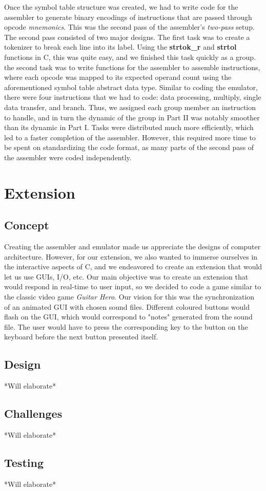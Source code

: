 \documentclass[11pt]{article}
\begin{document}
Once the symbol table structure was created, we had to write code for the assembler to generate binary encodings of instructions that are passed through opcode \emph{mnemonics}. This was the second pass of the assembler's \emph{two-pass} setup. The second pass consisted of two major designs. The first task was to create a tokenizer to break each line into its label. Using the \textbf{strtok\_r} and \textbf{strtol} functions in C, this was quite easy, and we finished this task quickly as a group. the second task was to write functions for the assembler to assemble instructions, where each opcode was mapped to its expected operand count using the aforementioned symbol table abstract data type. Similar to coding the emulator, there were four instructions that we had to code: data processing, multiply, single data transfer, and branch. Thus, we assigned each group member an instruction to handle, and in turn the dynamic of the group in Part II was notably smoother than its dynamic in Part I. Tasks were distributed much more efficiently, which led to a faster completion of the assembler. However, this required more time to be spent on standardizing the code format, as many parts of the second pass of the assembler were coded independently.

\section{Extension}

\subsection{Concept}

Creating the assembler and emulator made us appreciate the designs of computer architecture. However, for our extension, we also wanted to immerse ourselves in the interactive aspects of C, and we endeavored to create an extension that would let us use GUIs, I/O, etc. Our main objective was to create an extension that would respond in real-time to user input, so we decided to code a game similar to the classic video game \emph{Guitar Hero}. Our vision for this was the synchronization of an animated GUI with chosen sound files. Different coloured buttons would flash on the GUI, which would correspond to "notes" generated from the sound file. The user would have to press the corresponding key to the button on the keyboard before the next button presented itself.

\subsection{Design}

*Will elaborate*

\subsection{Challenges}

*Will elaborate*

\subsection{Testing}

*Will elaborate*
\end{document}
